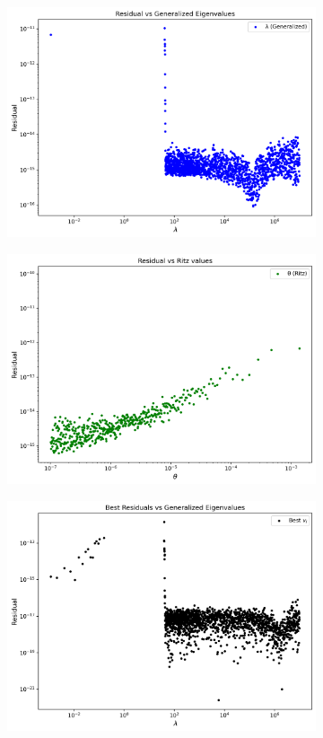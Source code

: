 \begin{figure}\label{fig:LUResidualsLargeShift}
	\caption{Residuals plot with large shift $\sigma=1.5 \times 10^5$}
	\centering
	\begin{subfigure}{.5\textwidth}
		\centering
		\includegraphics[width=.8\linewidth]{./Plots/LU/residual_lu_gl.png}
		\caption{}
		\label{fig:LUGenResLarge}
	\end{subfigure}%
	\begin{subfigure}{.5\textwidth}
		\centering
		\includegraphics[width=.8\linewidth]{./Plots/LU/residual_lu_rl.png}
		\caption{}
		\label{fig:LURitzResLarge}
	\end{subfigure}
	
	\vspace{0.5cm}
	
	\begin{subfigure}{.5\textwidth}
		\centering
		\includegraphics[width=.8\linewidth]{./Plots/LU/residual_lu_bl.png}
		\caption{}
		\label{fig:LUBestResLarge}
	\end{subfigure}
\end{figure}
